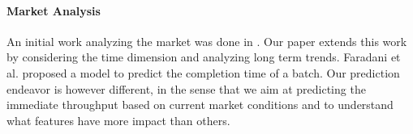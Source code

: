 \paragraph{Market Analysis}
An initial work analyzing the \amt{} market was done in \cite{mturk}. Our paper extends this work by considering the time dimension and analyzing long term trends.
Faradani et al. \cite{faradani2011s} proposed a model to predict the completion time of a batch. Our prediction endeavor is however different, in the sense that we aim at predicting the immediate throughput based on current market conditions and to understand what features  have more impact than others.

%
%


